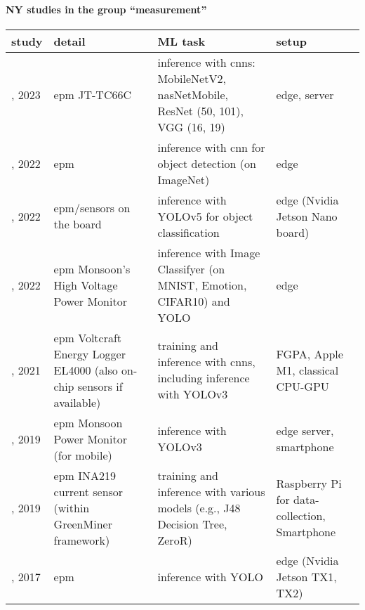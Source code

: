 \paragraph{NY studies in the group ``measurement''} 
 \label{tab:NY-measurement} 
\begin{longtable}{|>{\raggedright\arraybackslash}p{0.85cm}|p{4cm}|p{6cm}|>{\raggedright\arraybackslash}p{3.75cm}|}
\toprule
\bfseries study & \bfseries detail & \bfseries ML task & \bfseries setup \\
\midrule 
\endhead
\cite{hauschild2023}, 2023 & \acrshort{epm} JT-TC66C & inference with \acrshort{cnn}s: MobileNetV2, \acrshort{nas}NetMobile, ResNet (50, 101), VGG (16, 19) & edge, server \\
\cite{trihinas2022}, 2022 & \acrshort{epm} & inference with \acrshort{cnn} for object detection (on ImageNet) & edge  \\
\cite{machado2022}, 2022 & \acrshort{epm}/sensors on the board & inference with YOLOv5 for object classification & edge (Nvidia Jetson Nano board) \\
\cite{hampau2022}, 2022 & \acrshort{epm} Monsoon's High Voltage Power Monitor & inference with Image Classifyer (on MNIST, Emotion, CIFAR10) and YOLO & edge \\
\cite{hesse2021}, 2021 & \acrshort{epm} Voltcraft Energy Logger EL4000 (also on-chip sensors if available) & training and inference with \acrshort{cnn}s, including inference with YOLOv3 & FGPA, Apple M1, classical CPU-GPU \\
\cite{wang2019}, 2019 & \acrshort{epm} Monsoon Power Monitor (for mobile) & inference with YOLOv3 & edge server, smartphone \\
\cite{mcintosh2019}, 2019 & \acrshort{epm} INA219 current sensor (within GreenMiner framework) & training and inference with various models (e.g., J48 Decision Tree, ZeroR) & Raspberry Pi for data-collection, Smartphone \\
\cite{rungsuptaweekoon2017}, 2017 & \acrshort{epm} & inference with YOLO & edge (Nvidia Jetson TX1, TX2) \\
\bottomrule
\end{longtable}
